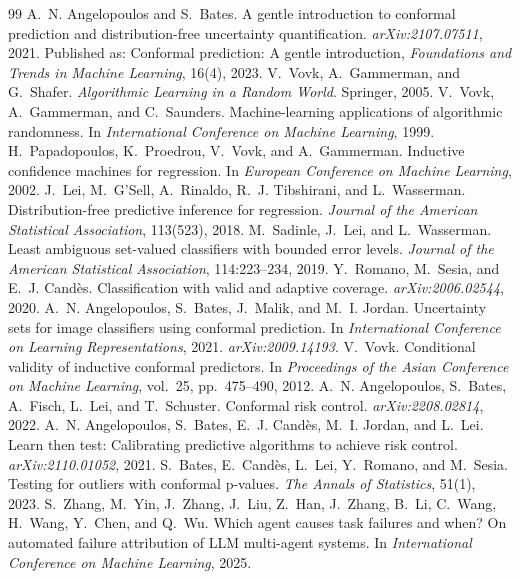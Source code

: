 \documentclass[11pt]{article}
\theoremstyle{definition}
\begin{document}
\begin{thebibliography}{99}\small
{} A.~N. Angelopoulos and S.~Bates. A gentle introduction to conformal prediction and distribution-free uncertainty quantification. \emph{arXiv:2107.07511}, 2021. Published as: Conformal prediction: A gentle introduction, \emph{Foundations and Trends in Machine Learning}, 16(4), 2023.
 V.~Vovk, A.~Gammerman, and G.~Shafer. \emph{Algorithmic Learning in a Random World}. Springer, 2005.
 V.~Vovk, A.~Gammerman, and C.~Saunders. Machine-learning applications of algorithmic randomness. In \emph{International Conference on Machine Learning}, 1999.
 H.~Papadopoulos, K.~Proedrou, V.~Vovk, and A.~Gammerman. Inductive confidence machines for regression. In \emph{European Conference on Machine Learning}, 2002.
 J.~Lei, M.~G'Sell, A.~Rinaldo, R.~J. Tibshirani, and L.~Wasserman. Distribution-free predictive inference for regression. \emph{Journal of the American Statistical Association}, 113(523), 2018.
 M.~Sadinle, J.~Lei, and L.~Wasserman. Least ambiguous set-valued classifiers with bounded error levels. \emph{Journal of the American Statistical Association}, 114:223--234, 2019.
 Y.~Romano, M.~Sesia, and E.~J. Cand\`es. Classification with valid and adaptive coverage. \emph{arXiv:2006.02544}, 2020.
 A.~N. Angelopoulos, S.~Bates, J.~Malik, and M.~I. Jordan. Uncertainty sets for image classifiers using conformal prediction. In \emph{International Conference on Learning Representations}, 2021. \emph{arXiv:2009.14193}.
 V.~Vovk. Conditional validity of inductive conformal predictors. In \emph{Proceedings of the Asian Conference on Machine Learning}, vol.~25, pp.~475--490, 2012.
 A.~N. Angelopoulos, S.~Bates, A.~Fisch, L.~Lei, and T.~Schuster. Conformal risk control. \emph{arXiv:2208.02814}, 2022.
 A.~N. Angelopoulos, S.~Bates, E.~J. Cand\`es, M.~I. Jordan, and L.~Lei. Learn then test: Calibrating predictive algorithms to achieve risk control. \emph{arXiv:2110.01052}, 2021.
 S.~Bates, E.~Cand\`es, L.~Lei, Y.~Romano, and M.~Sesia. Testing for outliers with conformal p-values. \emph{The Annals of Statistics}, 51(1), 2023.
 S.~Zhang, M.~Yin, J.~Zhang, J.~Liu, Z.~Han, J.~Zhang, B.~Li, C.~Wang, H.~Wang, Y.~Chen, and Q.~Wu. Which agent causes task failures and when? On automated failure attribution of LLM multi-agent systems. In \emph{International Conference on Machine Learning}, 2025.

\end{thebibliography}
\end{document}
